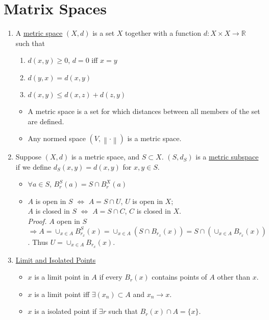 \documentclass[%
 aip,
 jmp,%
 amsmath,amssymb,
 reprint,%
]{revtex4-1}
\def\R{{\mathbb R}}
\renewenvironment{proof}{\color{gray}\footnotesize\emph{Proof.}}{}
\newcommand{\norm}[1]{\left\lVert#1\right\rVert}
\newcommand{\imply}{\Rightarrow}
\renewcommand{\iff}{\Leftrightarrow}
\newcommand{\defn}[1]{\underline{#1}}
\begin{document}
\section{Matrix Spaces}
\begin{enumerate}
  \item A \defn{metric space} $(X,d)$ is a set $X$ together with a function
  $d:X\times X \to\R$ such that
      \begin{enumerate}
        \item $d(x,y) \ge 0$, $d=0$ iff $x=y$
        \item $d(y,x) = d(x,y)$
        \item $d(x,y) \le d(x,z) + d(z,y)$
      \end{enumerate}
      \begin{itemize}
        \item {\footnotesize A metric space is a set for which distances
        between all members of the set are defined.}
        \item Any normed space $(V, \norm{\cdot})$ is a metric space.
      \end{itemize}

  \item Suppose $(X,d)$ is a metric space, and $S\subset X$.
  $(S,d_S)$ is a \defn{metric subspace} if we define
  $d_S(x,y) = d(x,y)$ for $x,y\in S$.
      \begin{itemize}
        \item $\forall a\in S$, $B_r^S(a) = S \cap B_r^X(a)$
        \item
        $A$ is open in $S$ $\iff$ $A=S\cap U$, $U$ is open in $X$;\\
        $A$ is closed in $S$ $\iff$ $A=S\cap C$, $C$ is closed in $X$.\\
          \begin{proof}
            $A$ open in $S$ $\imply A=\cup_{x\in A}B_{r_x}^{S}(x) =
            \cup_{x\in A}(S\cap B_{r_x}(x)) =
            S \cap (\cup_{x\in A}B_{r_x}(x))$.
            Thus $U = \cup_{x\in A}B_{r_x}(x)$.
          \end{proof}
      \end{itemize}

  \item \defn{Limit and Isolated Points}
      \begin{itemize}
        \item $x$ is a limit point in $A$ if every $B_r(x)$ contains points of
        $A$ other than $x$.
        \item $x$ is a limit point iff $\exists(x_n)\subset A$ and $x_n \to x$.
        \item $x$ is a isolated point if $\exists r$ such that $B_r(x)\cap A=\{x\}$.
      \end{itemize}


\end{enumerate}
\end{document}
